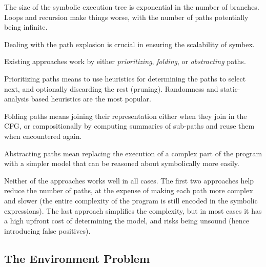 The size of the symbolic execution tree is exponential in the number of branches. Loops and recursion make things worse, with the number of paths potentially being infinite.

Dealing with the path explosion is crucial in ensuring the scalability of symbex.

Existing approaches work by either \emph{prioritizing}, \emph{folding}, or \emph{abstracting} paths.

Prioritizing paths means to use heuristics for determining the paths to select next, and optionally discarding the rest (pruning).  Randomness and static-analysis based heuristics are the most popular.

Folding paths means joining their representation either when they join in the CFG, or compositionally by computing summaries of sub-paths and reuse them when encountered again.

Abstracting paths mean replacing the execution of a complex part of the program with a simpler model that can be reasoned about symbolically more easily.

Neither of the approaches works well in all cases. The first two approaches help reduce the number of paths, at the expense of making each path more complex and slower (the entire complexity of the program is still encoded in the symbolic expressions).  The last approach simplifies the complexity, but in most cases it has a high upfront cost of determining the model, and risks being unsound (hence introducing false positives).

\subsection{The Environment Problem}


